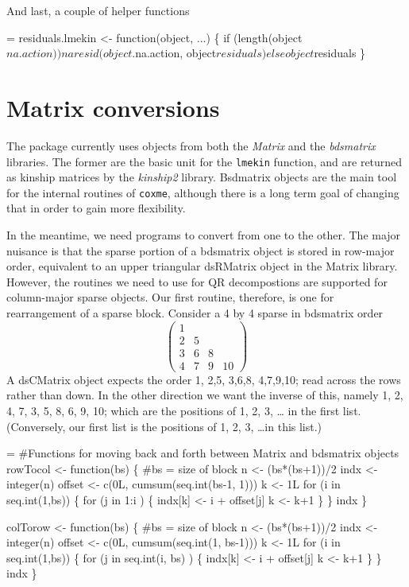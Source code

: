 \documentclass{article}
\begin{document}
And last, a couple of helper functions
\begin{nwchunk}
=
 residuals.lmekin <- function(object, ...) \{
     if (length(object$na.action)) naresid(object$.na.action, object$residuals)
     else object$residuals
 \}
\end{nwchunk}
\section{Matrix conversions}
 The package currently uses objects from both the \emph{Matrix} and
the \emph{bdsmatrix} libraries.
The former are the basic unit for the \Verb!lmekin! function, and are
returned as kinship matrices by the \emph{kinship2} library.
Bsdmatrix objects are the main tool for the internal routines of 
\Verb!coxme!, although there is a long term goal of changing that in
order to gain more flexibility.

In the meantime, we need programs to convert from one to the other.
The major nuisance is that the sparse portion of a bdsmatrix object
is stored in row-major order, equivalent to an upper triangular
dsRMatrix object in the Matrix library. 
However, the routines we need to use for QR
decompostions are supported for column-major sparse objects.  Our
first routine, therefore, is one for rearrangement of a sparse
block.
Consider a 4 by 4 sparse in bdsmatrix order
$$
\left( \begin{array}{cccc}
  1\\ 2&5 \\ 3&6&8 \\ 4&7&9&10
  \end{array} \right)
$$
A dsCMatrix object expects the order 1, 2,5, 3,6,8, 4,7,9,10; read across
the rows rather than down.
In the other direction we want the inverse of this, namely
1, 2, 4, 7, 3, 5, 8, 6, 9, 10; which are the positions of 1, 2, 3, \ldots
in the first list.
(Conversely, our first list is the positions of 1, 2, 3, \ldots in 
this list.)

\begin{nwchunk}
=
 #Functions for moving back and forth between Matrix and bdsmatrix objects
 rowTocol <- function(bs) \{  #bs = size of block
     n <- (bs*(bs+1))/2
     indx <- integer(n)
     offset <- c(0L, cumsum(seq.int(bs-1, 1)))
     k <- 1L
     for (i in seq.int(1,bs)) \{
         for (j in 1:i ) \{
             indx[k] <- i + offset[j]
             k <- k+1
             \}
         \}
     indx                              
 \}
 
 colTorow <- function(bs) \{  #bs = size of block
     n <- (bs*(bs+1))/2
     indx <- integer(n)
     offset <- c(0L, cumsum(seq.int(1, bs-1)))
     k <- 1L
     for (i in seq.int(1,bs)) \{
         for (j in seq.int(i, bs) ) \{
             indx[k] <- i + offset[j]
             k <- k+1
             \}
         \}
     indx                              
 \}
\end{nwchunk}
\end{document}
